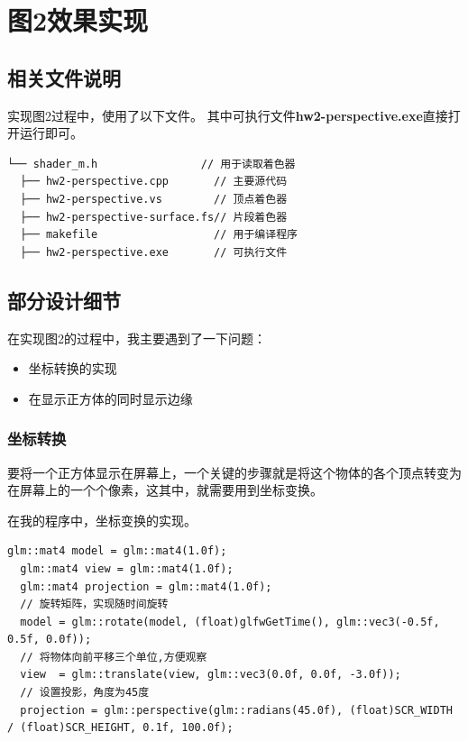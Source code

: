 \documentclass[forprint]{myreport}
\begin{document}
\chapter{图2效果实现}

\section{相关文件说明}

实现图2过程中，使用了以下文件。
其中可执行文件\textbf{hw2-perspective.exe}直接打开运行即可。

\begin{lstlisting}[style = c]
  └── shader_m.h                // 用于读取着色器
  ├── hw2-perspective.cpp       // 主要源代码
  ├── hw2-perspective.vs        // 顶点着色器
  ├── hw2-perspective-surface.fs// 片段着色器
  ├── makefile                  // 用于编译程序
  ├── hw2-perspective.exe       // 可执行文件
\end{lstlisting}

\section{部分设计细节}

在实现图2的过程中，我主要遇到了一下问题：

\begin{itemize}
  \item 坐标转换的实现
  \item 在显示正方体的同时显示边缘
\end{itemize}

\subsection{坐标转换}

要将一个正方体显示在屏幕上，一个关键的步骤就是将这个物体的各个顶点转变为在屏幕上的一个个像素，这其中，就需要用到坐标变换。

在我的程序中，坐标变换的实现。

\begin{lstlisting}[style = c]
  glm::mat4 model = glm::mat4(1.0f);
  glm::mat4 view = glm::mat4(1.0f);
  glm::mat4 projection = glm::mat4(1.0f);
  // 旋转矩阵，实现随时间旋转
  model = glm::rotate(model, (float)glfwGetTime(), glm::vec3(-0.5f, 0.5f, 0.0f));
  // 将物体向前平移三个单位,方便观察
  view  = glm::translate(view, glm::vec3(0.0f, 0.0f, -3.0f));
  // 设置投影，角度为45度
  projection = glm::perspective(glm::radians(45.0f), (float)SCR_WIDTH / (float)SCR_HEIGHT, 0.1f, 100.0f);
\end{lstlisting}
\end{document}
